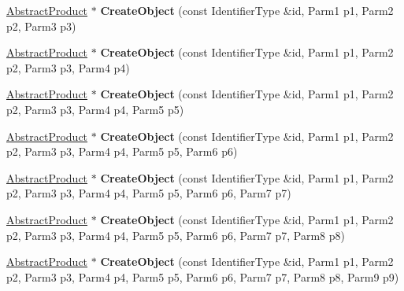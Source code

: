 \begin{DoxyCompactItemize}
\item 
\hypertarget{classLoki_1_1Factory_a67b5bafa738eea74e48ad2ae6bd1f50a}{}\hyperlink{classAbstractProduct}{Abstract\+Product} $\ast$ {\bfseries Create\+Object} (const Identifier\+Type \&id, Parm1 p1, Parm2 p2, Parm3 p3)\label{classLoki_1_1Factory_a67b5bafa738eea74e48ad2ae6bd1f50a}

\item 
\hypertarget{classLoki_1_1Factory_a3dcd1c6b33d8affa002baf5632295839}{}\hyperlink{classAbstractProduct}{Abstract\+Product} $\ast$ {\bfseries Create\+Object} (const Identifier\+Type \&id, Parm1 p1, Parm2 p2, Parm3 p3, Parm4 p4)\label{classLoki_1_1Factory_a3dcd1c6b33d8affa002baf5632295839}

\item 
\hypertarget{classLoki_1_1Factory_a71b14a8cc9093edfd0f16f01c1fd8dc8}{}\hyperlink{classAbstractProduct}{Abstract\+Product} $\ast$ {\bfseries Create\+Object} (const Identifier\+Type \&id, Parm1 p1, Parm2 p2, Parm3 p3, Parm4 p4, Parm5 p5)\label{classLoki_1_1Factory_a71b14a8cc9093edfd0f16f01c1fd8dc8}

\item 
\hypertarget{classLoki_1_1Factory_abf372624cd4607a53177d892dfba4805}{}\hyperlink{classAbstractProduct}{Abstract\+Product} $\ast$ {\bfseries Create\+Object} (const Identifier\+Type \&id, Parm1 p1, Parm2 p2, Parm3 p3, Parm4 p4, Parm5 p5, Parm6 p6)\label{classLoki_1_1Factory_abf372624cd4607a53177d892dfba4805}

\item 
\hypertarget{classLoki_1_1Factory_aeee04ca17389341f67d0515ff95edb79}{}\hyperlink{classAbstractProduct}{Abstract\+Product} $\ast$ {\bfseries Create\+Object} (const Identifier\+Type \&id, Parm1 p1, Parm2 p2, Parm3 p3, Parm4 p4, Parm5 p5, Parm6 p6, Parm7 p7)\label{classLoki_1_1Factory_aeee04ca17389341f67d0515ff95edb79}

\item 
\hypertarget{classLoki_1_1Factory_a4370997b0548bc8838a59b4e0259f777}{}\hyperlink{classAbstractProduct}{Abstract\+Product} $\ast$ {\bfseries Create\+Object} (const Identifier\+Type \&id, Parm1 p1, Parm2 p2, Parm3 p3, Parm4 p4, Parm5 p5, Parm6 p6, Parm7 p7, Parm8 p8)\label{classLoki_1_1Factory_a4370997b0548bc8838a59b4e0259f777}

\item 
\hypertarget{classLoki_1_1Factory_a0094f0b597281c04c75dafbd87c05b5a}{}\hyperlink{classAbstractProduct}{Abstract\+Product} $\ast$ {\bfseries Create\+Object} (const Identifier\+Type \&id, Parm1 p1, Parm2 p2, Parm3 p3, Parm4 p4, Parm5 p5, Parm6 p6, Parm7 p7, Parm8 p8, Parm9 p9)\label{classLoki_1_1Factory_a0094f0b597281c04c75dafbd87c05b5a}


\end{DoxyCompactItemize}
